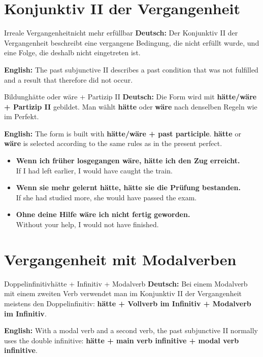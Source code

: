 \documentclass[a4paper,11pt]{article}
\newcommand{\GermanText}[1]{\textbf{Deutsch: }#1\par}
\newcommand{\EnglishText}[1]{{\small\color{SoftGray}\textbf{English: }#1\par}}
\newcommand{\ExampleItem}[2]{\item \textbf{#1}\\{\small\color{SoftGray}#2}}
\begin{document}
    \section{Konjunktiv II der Vergangenheit}

        \begin{grammarentry}{Irreale Vergangenheit}{nicht mehr erfüllbar}
            \GermanText{Der Konjunktiv II der Vergangenheit beschreibt eine vergangene Bedingung, die nicht erfüllt wurde, und eine Folge, die deshalb nicht eingetreten ist.}
            \EnglishText{The past subjunctive II describes a past condition that was not fulfilled and a result that therefore did not occur.}
        \end{grammarentry}

        \begin{grammarentry}{Bildung}{hätte oder wäre + Partizip II}
            \GermanText{Die Form wird mit \textbf{hätte/wäre + Partizip II} gebildet. Man wählt \textbf{hätte} oder \textbf{wäre} nach denselben Regeln wie im Perfekt.}
            \EnglishText{The form is built with \textbf{hätte/wäre + past participle}. \textbf{hätte} or \textbf{wäre} is selected according to the same rules as in the present perfect.}
        \end{grammarentry}

        \begin{exbox}
            \begin{itemize}
                \ExampleItem{Wenn ich früher losgegangen wäre, hätte ich den Zug erreicht.}{If I had left earlier, I would have caught the train.}
                \ExampleItem{Wenn sie mehr gelernt hätte, hätte sie die Prüfung bestanden.}{If she had studied more, she would have passed the exam.}
                \ExampleItem{Ohne deine Hilfe wäre ich nicht fertig geworden.}{Without your help, I would not have finished.}
            \end{itemize}
        \end{exbox}

    \section{Vergangenheit mit Modalverben}

        \begin{grammarentry}{Doppelinfinitiv}{hätte + Infinitiv + Modalverb}
            \GermanText{Bei einem Modalverb mit einem zweiten Verb verwendet man im Konjunktiv II der Vergangenheit meistens den Doppelinfinitiv: \textbf{hätte + Vollverb im Infinitiv + Modalverb im Infinitiv}.}
            \EnglishText{With a modal verb and a second verb, the past subjunctive II normally uses the double infinitive: \textbf{hätte + main verb infinitive + modal verb infinitive}.}
        \end{grammarentry}
\end{document}
